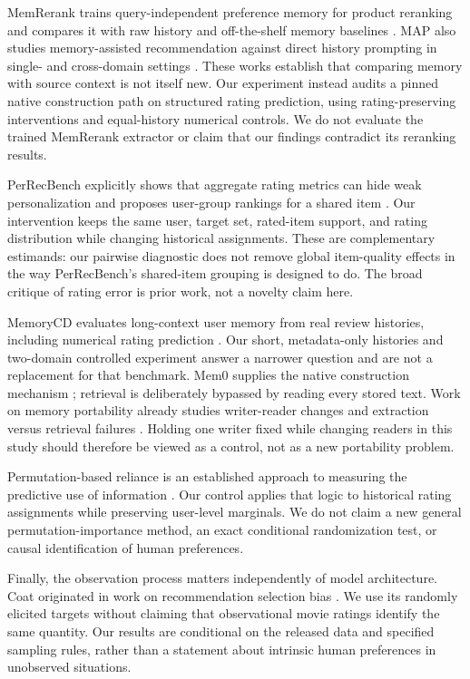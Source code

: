\documentclass{article}
\begin{document}
MemRerank trains query-independent preference memory for product reranking and compares it with raw history and off-the-shelf memory baselines \citep{peng2026memrerank}. MAP also studies memory-assisted recommendation against direct history prompting in single- and cross-domain settings \citep{chen2025map}. These works establish that comparing memory with source context is not itself new. Our experiment instead audits a pinned native construction path on structured rating prediction, using rating-preserving interventions and equal-history numerical controls. We do not evaluate the trained MemRerank extractor or claim that our findings contradict its reranking results.

PerRecBench explicitly shows that aggregate rating metrics can hide weak personalization and proposes user-group rankings for a shared item \citep{tan2025preferences}. Our intervention keeps the same user, target set, rated-item support, and rating distribution while changing historical assignments. These are complementary estimands: our pairwise diagnostic does not remove global item-quality effects in the way PerRecBench's shared-item grouping is designed to do. The broad critique of rating error is prior work, not a novelty claim here.

MemoryCD evaluates long-context user memory from real review histories, including numerical rating prediction \citep{zhang2026memorycd}. Our short, metadata-only histories and two-domain controlled experiment answer a narrower question and are not a replacement for that benchmark. Mem0 supplies the native construction mechanism \citep{chhikara2025mem0}; retrieval is deliberately bypassed by reading every stored text. Work on memory portability already studies writer-reader changes and extraction versus retrieval failures \citep{goyal2026portability}. Holding one writer fixed while changing readers in this study should therefore be viewed as a control, not as a new portability problem.

Permutation-based reliance is an established approach to measuring the predictive use of information \citep{fisher2019reliance}. Our control applies that logic to historical rating assignments while preserving user-level marginals. We do not claim a new general permutation-importance method, an exact conditional randomization test, or causal identification of human preferences.

Finally, the observation process matters independently of model architecture. Coat originated in work on recommendation selection bias \citep{schnabel2016recommendations}. We use its randomly elicited targets without claiming that observational movie ratings identify the same quantity. Our results are conditional on the released data and specified sampling rules, rather than a statement about intrinsic human preferences in unobserved situations.
\end{document}
